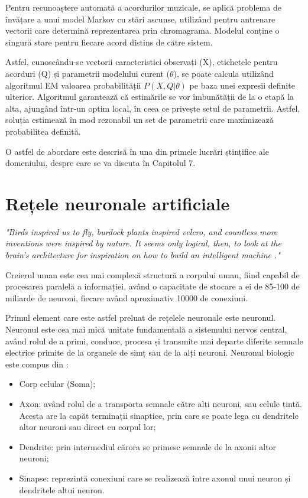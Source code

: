 \documentclass[a4paper,12pt]{report}
\begin{document}
Pentru recunoaștere automată a acordurilor muzicale, se aplică problema de 
învățare a unui model Markov cu stări ascunse, utilizând pentru antrenare 
vectorii care determină reprezentarea prin chromagrama.
Modelul conține o singură stare pentru fiecare 
acord distins de către sistem. 

Astfel, cunoscându-se vectorii caracteristici observați (X), etichetele pentru acorduri (Q) 
și parametrii modelului curent ($\theta$), se poate calcula utilizând algoritmul EM
valoarea probabilității $P(X, Q|\theta)$ pe baza unei expresii definite ulterior. Algoritmul
garantează că estimările se vor îmbunătății de la o etapă la alta, ajungând
într-un optim local, în ceea ce privește setul de parametrii. Astfel, soluția estimează
în mod rezonabil un set de parametrii care maximizează probabilitea definită.

O astfel de abordare este descrisă în una din primele lucrări ștințifice ale domeniului,
despre care se va discuta în Capitolul 7. 

\newpage
\section{Rețele neuronale artificiale}
\emph{"Birds inspired us to fly, burdock plants inspired velcro, and countless more inventions
were inspired by nature. It seems only logical, then, to look at the brain’s architecture
for inspiration on how to build an intelligent machine \cite{Hands-On-Machine-Learning}."}

Creierul uman este cea mai complexă structură a corpului uman, fiind capabil de 
procesarea paralelă a informației, având o capacitate de stocare a ei de 85-100 de
miliarde de neuroni, fiecare având aproximativ 10000 de conexiuni.

Primul element care este astfel preluat de rețelele neuronale este neuronul. Neuronul 
este cea mai mică unitate fundamentală a sistemului nervos central, având rolul de a 
primi, conduce, procesa și transmite mai departe 
diferite semnale electrice primite de la organele 
de simț sau de la alți neuroni. Neuronul biologic este compus din \cite{Tehnici-de-inteligență-computațională-Aplicații-în-electronică-și-biomedicină}: 
\begin{itemize}
    \item Corp celular (Soma);
    \item Axon: având rolul de a transporta semnale către alți neuroni, sau celule țintă. Acesta 
are la capăt terminații sinaptice, prin care se poate lega cu dendritele altor neuroni sau direct
cu corpul lor;
    \item Dendrite: prin intermediul cărora se primesc semnale de la axonii altor neuroni;
    \item Sinapse: reprezintă conexiuni care se realizează între axonul unui neuron și 
dendritele altui neuron.
\end{itemize}
\end{document}
